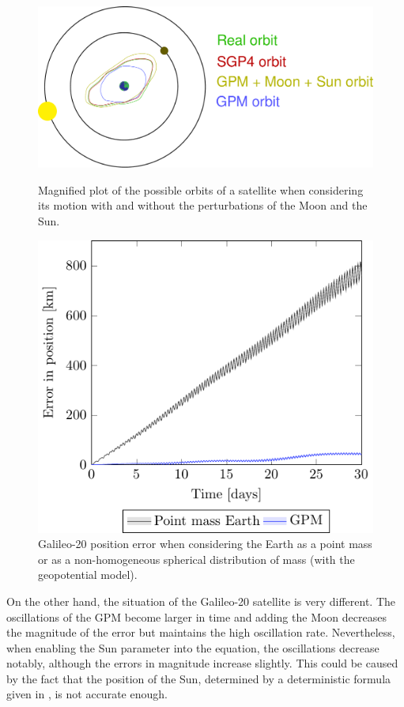 \documentclass[../main.tex]{subfiles}
\begin{document}
\begin{figure}[ht]
  \centering
  \begin{minipage}[ht]{0.45\textwidth}
    \centering
    \includegraphics[width=\textwidth]{Images/meo_explanation.pdf}
    \caption{Magnified plot of the possible orbits of a satellite when considering its motion with and without the perturbations of the Moon and the Sun.}
    \label{fig:meo_explanation}
  \end{minipage}
  \hspace{0.0333333\textwidth}
  \begin{minipage}[ht]{0.45\textwidth}
    \centering
    \includegraphics[width=\textwidth]{Images/simulation/GALILEO_pointMass_comparison.pdf}
    \caption{Galileo-20 position error when considering the Earth as a point mass or as a non-homogeneous spherical distribution of mass (with the geopotential model).}
    \label{fig:Galileo_point}
  \end{minipage}
\end{figure}
On the other hand, the situation of the Galileo-20 satellite is very different. The oscillations of the GPM become larger in time and adding the Moon decreases the magnitude of the error but maintains the high oscillation rate. Nevertheless, when enabling the Sun parameter into the equation, the oscillations decrease notably, although the errors in magnitude increase slightly. This could be caused by the fact that the position of the Sun, determined by a deterministic formula given in \cite{montenbruck}, is not accurate enough.
\end{document}
